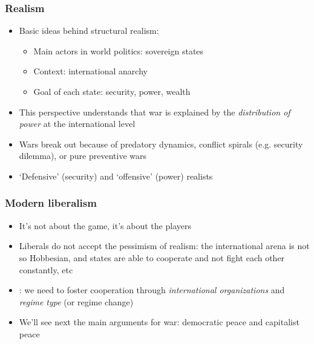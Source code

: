 \documentclass[aspectratio=43]{beamer}
\begin{document}
\begin{frame}
\frametitle{Realism}
\centering

\begin{itemize}
\item<1-> Basic ideas behind structural realism:
  \begin{itemize}
  \item Main actors in world politics: sovereign states
  \item Context: international anarchy
  \item Goal of each state: security, power, wealth
  \end{itemize}
\item<2-> This perspective understands that war is explained by the \textit{distribution of power} at the international level
\item<3-> Wars break out because of predatory dynamics, conflict spirals (e.g. security dilemma), or pure preventive wars
\item<4-> `Defensive' (security) and `offensive' (power) realists
\end{itemize}

\end{frame}

\begin{frame}
\frametitle{Modern liberalism}
\centering

\begin{itemize}[<+->]
  \item It's not about the game, it's about the players
  \item Liberals do not accept the pessimism of realism: the international arena is not so Hobbesian, and states are able to cooperate and not fight each other constantly, etc
  \item {}: we need to foster cooperation through \textit{international organizations} and \textit{regime type} (or regime change)
  \item We'll see next the main arguments for war: democratic peace and capitalist peace
\end{itemize}

\end{frame}
\end{document}
